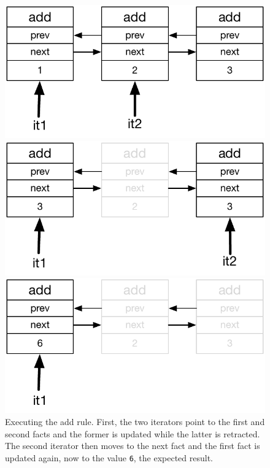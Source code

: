 \begin{figure}
\centering
\begin{minipage}{.5\textwidth}
  \centering
  \includegraphics[width=.8\linewidth]{figures/compiler/update}
\end{minipage}%
\begin{minipage}{.5\textwidth}
  \centering
  \includegraphics[width=0.8\linewidth]{figures/compiler/update2}
\end{minipage}
\begin{minipage}{.5\textwidth}
   \centering
   \includegraphics[width=0.8\linewidth]{figures/compiler/update3}
\end{minipage}
\caption{Executing the add rule. First, the two iterators point to
   the first and second facts and the former is updated while the latter is
   retracted. The second iterator then moves to the next fact and the first fact is
   updated again, now to the value \texttt{6}, the expected result.}
\label{fig:update_add}
\end{figure}

